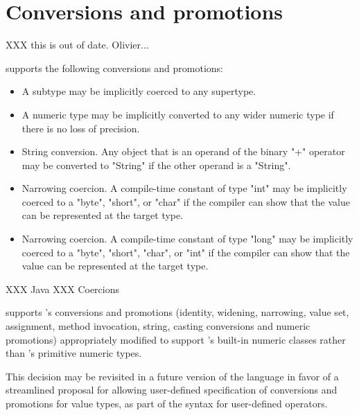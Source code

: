 \section{Conversions and promotions}\label{XtenConversions}\label{XtenPromotions}

XXX this is out of date.  Olivier...

\XtenCurrVer{} supports the following conversions and
promotions:
\begin{itemize}
\item A subtype may be implicitly coerced to any supertype.
\item A numeric type may be implicitly converted to any wider
numeric type if there is no loss of precision.
\item String conversion.  Any object that is an operand of the binary
\xcd"+" operator may
be converted to \xcd"String" if the other operand is a \xcd"String".
\item Narrowing coercion.  A compile-time constant of type \xcd"int" may be
implicitly coerced to a \xcd"byte", \xcd"short", or \xcd"char"
if the compiler can show that the value can be represented at
the target type.
\item Narrowing coercion.  A compile-time constant of type
\xcd"long" may be
implicitly coerced to a \xcd"byte", \xcd"short", \xcd"char",
or \xcd"int"
if the compiler can show that the value can be represented at
the target type.
\end{itemize}

XXX Java
XXX Coercions

{}\XtenCurrVer{} supports \java's conversions and promotions
(identity, widening, narrowing, value set, assignment, method
invocation, string, casting conversions and numeric promotions)
appropriately modified to support \Xten's built-in numeric classes
rather than \java's primitive numeric types.

This decision may be revisited in a future version of the language in
favor of a streamlined proposal for allowing user-defined
specification of conversions and promotions for value types, as part
of the syntax for user-defined operators.


